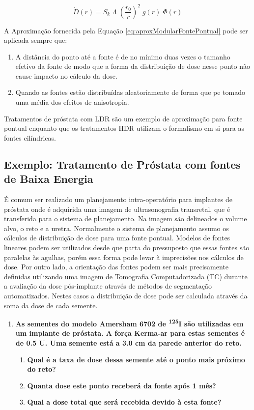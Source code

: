\documentclass[11pt,a4paper]{article}
\begin{document}
			\begin{equation}
				\dot{D}(r) = S_k \; \varLambda \; \left(\frac{r_0}{r} \right)^2 \; g(r) \; \Phi (r)
				\label{eq:aproxModularFontePontual}
			\end{equation}
			
			A Aproximação fornecida pela Equação \ref{eq:aproxModularFontePontual} pode ser aplicada sempre que:

			\begin{enumerate}
				\item A distância do ponto até a fonte é de no mínimo duas vezes o tamanho efetivo da fonte de modo que a forma da distribuição de dose nesse ponto não cause impacto no cálculo da dose.
				\item Quando as fontes estão distribuídas aleatoriamente de forma que pe tomado uma média dos efeitos de anisotropia.
			\end{enumerate}

			Tratamentos de próstata com LDR são um exemplo de aproximação para fonte pontual enquanto que os tratamentos HDR utilizam o formalismo em si para as fontes cilíndricas.

		\subsection*{\textcolor{CarnationPink}{Exemplo: Tratamento de Próstata com fontes de Baixa Energia}}

			É comum ser realizado um planejamento intra-operatório para implantes de próstata onde é adquirida uma imagem de ultrasonografia transretal, que é transferida para o sistema de planejamento. Na imagem são delineados o volume alvo, o reto e a uretra. Normalmente o sistema de planejamento assumo os cálculos de distribuição de dose para uma fonte pontual. Modelos de fontes lineares podem ser utilizados desde que parta do pressuposto que essas fontes são paralelas às agulhas, porém essa forma pode levar à imprecisões nos cálculos de dose. Por outro lado, a orientação das fontes podem ser mais precisamente definidas utilizando uma imagem de Tomografia Computadorizada (TC) durante a avaliação da dose pós-implante através de métodos de segmentação automatizados. Nestes casos a distribuição de dose pode ser calculada através da soma da dose de cada semente.

			\begin{enumerate}
				\item \textbf{As sementes do modelo Amersham 6702 de \textsuperscript{125}I são utilizadas em um implante de próstata. A força Kerma-ar para estas sementes é de 0.5 U. Uma semente está a 3.0 cm da parede anterior do reto.}
				
					\begin{enumerate}
						\item \textbf{Qual é a taxa de dose dessa semente até o ponto mais próximo do reto?}
						\item \textbf{Quanta dose este ponto receberá da fonte após 1 mês?}
						\item \textbf{Qual a dose total que será recebida devido à esta fonte?}
					\end{enumerate}
			\end{enumerate}
\end{document}
